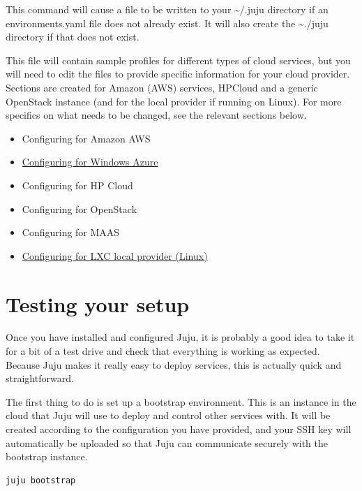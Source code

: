 \documentclass[letterpaper,10pt,english]{sphinxmanual}
\begin{document}
This command will cause a file to be written to your \textasciitilde{}/.juju directory
if an environments.yaml file does not already exist. It will also
create the \textasciitilde{}./juju directory if that does not exist.

This file will contain sample profiles for different types of cloud
services, but you will need to edit the files to provide specific
information for your cloud provider. Sections are created for Amazon
(AWS) services, HPCloud and a generic OpenStack instance (and for the
local provider if running on Linux). For more specifics on what needs
to be changed, see the relevant sections below.
\begin{itemize}
\item {} 
Configuring for Amazon AWS

\item {} 
\href{https://juju.ubuntu.com/config-azure.html}{Configuring for Windows Azure}

\item {} 
Configuring for HP Cloud

\item {} 
Configuring for OpenStack

\item {} 
Configuring for MAAS

\item {} 
\href{https://juju.ubuntu.com/config-local.html}{Configuring for LXC local provider (Linux)}

\end{itemize}


\chapter{Testing your setup}
\label{index:testing-your-setup}
Once you have installed and configured Juju, it is probably a good
idea to take it for a bit of a test drive and check that everything is
working as expected. Because Juju makes it really easy to deploy
services, this is actually quick and straightforward.

The first thing to do is set up a bootstrap environment. This is an
instance in the cloud that Juju will use to deploy and control other
services with. It will be created according to the configuration you
have provided, and your SSH key will automatically be uploaded so that
Juju can communicate securely with the bootstrap instance.

\begin{Verbatim}[commandchars=\\\{\}]
juju bootstrap
\end{Verbatim}
\end{document}
